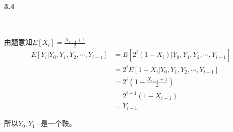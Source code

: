 \paragraph{3.4}~{}

由题意知$E[X_i] = \frac{X_{i-1}+1}{2}$
$$
\begin{aligned}
    E[Y_i|Y_0,Y_1,Y_2, \cdots ,Y_{i-1}] &= E[2^i(1-X_i)|Y_0,Y_1,Y_2, \cdots ,Y_{i-1}] \\
    &= 2^iE[1-X_i|Y_0,Y_1,Y_2, \cdots ,Y_{i-1}] \\ 
    &= 2^i(1-\frac{X_{i-1}+1}{2}) \\
    &= 2^{i-1}(1-X_{i-1}) \\
    &= Y_{i-1}
\end{aligned}
$$

所以$Y_0,Y_1 \cdots $是一个鞅。